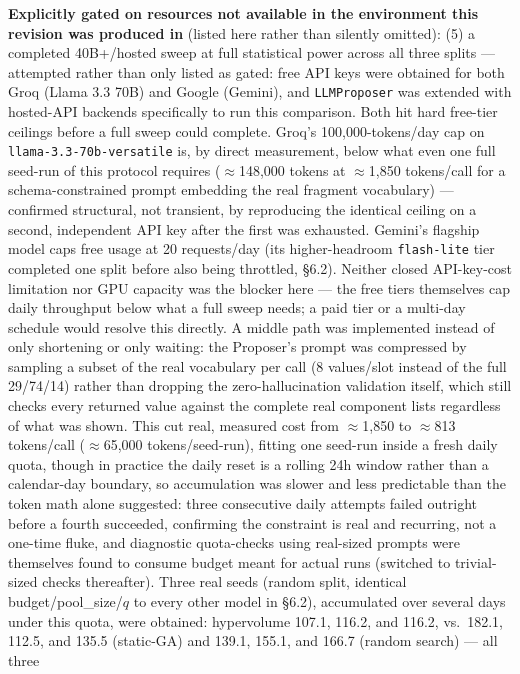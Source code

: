 \documentclass{article}
\begin{document}
\textbf{Explicitly gated on resources not available in the environment
this revision was produced in} (listed here rather than silently
omitted): (5) a completed 40B+/hosted sweep at full statistical power
across all three splits --- attempted rather than only listed as gated:
free API keys were obtained for both Groq (Llama 3.3 70B) and Google
(Gemini), and \texttt{LLMProposer} was extended with hosted-API backends
specifically to run this comparison. Both hit hard free-tier ceilings
before a full sweep could complete. Groq's 100,000-tokens/day cap on
\texttt{llama-3.3-70b-versatile} is, by direct measurement, below what
even one full seed-run of this protocol requires ($\approx$148,000
tokens at $\approx$1,850 tokens/call for a schema-constrained prompt
embedding the real fragment vocabulary) --- confirmed structural, not
transient, by reproducing the identical ceiling on a second, independent
API key after the first was exhausted. Gemini's flagship model caps free
usage at 20 requests/day (its higher-headroom \texttt{flash-lite} tier
completed one split before also being throttled, \S6.2). Neither closed
API-key-cost limitation nor GPU capacity was the blocker here --- the
free tiers themselves cap daily throughput below what a full sweep
needs; a paid tier or a multi-day schedule would resolve this directly.
A middle path was implemented instead of only shortening or only waiting:
the Proposer's prompt was compressed by sampling a subset of the real
vocabulary per call (8 values/slot instead of the full 29/74/14) rather
than dropping the zero-hallucination validation itself, which still
checks every returned value against the complete real component lists
regardless of what was shown. This cut real, measured cost from
$\approx$1,850 to $\approx$813 tokens/call ($\approx$65,000
tokens/seed-run), fitting one seed-run inside a fresh daily quota, though
in practice the daily reset is a rolling 24h window rather than a
calendar-day boundary, so accumulation was slower and less predictable
than the token math alone suggested: three consecutive daily attempts
failed outright before a fourth succeeded, confirming the constraint is
real and recurring, not a one-time fluke, and diagnostic quota-checks
using real-sized prompts were themselves found to consume budget meant
for actual runs (switched to trivial-sized checks thereafter). Three real
seeds (random split, identical budget/pool\_size/$q$ to every other model
in \S6.2), accumulated over several days under this quota, were obtained:
hypervolume 107.1, 116.2, and 116.2, vs.\ 182.1, 112.5, and 135.5
(static-GA) and 139.1, 155.1, and 166.7 (random search) --- all three
\end{document}
